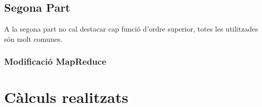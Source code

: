 \documentclass[11pt,a4paper]{article}
\begin{document}
	\subsection{Segona Part}
		A la segona part no cal destacar cap funció d'ordre superior, totes les utilitzades són molt comunes.
		
		\subsubsection{Modificació MapReduce}

	

\section{Càlculs realitzats}
\end{document}

